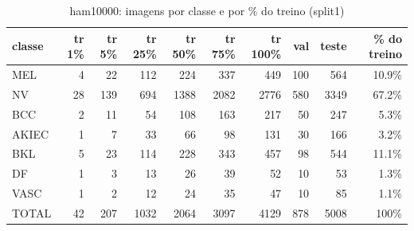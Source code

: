 \begin{table}[h]\centering\small
\caption{ham10000: imagens por classe e por \% do treino (split1)}
\begin{tabular}{lrrrrrrrrr}\toprule
classe & tr 1\% & tr 5\% & tr 25\% & tr 50\% & tr 75\% & tr 100\% & val & teste & \% do treino \\\midrule
MEL & 4 & 22 & 112 & 224 & 337 & 449 & 100 & 564 & 10.9\% \\
NV & 28 & 139 & 694 & 1388 & 2082 & 2776 & 580 & 3349 & 67.2\% \\
BCC & 2 & 11 & 54 & 108 & 163 & 217 & 50 & 247 & 5.3\% \\
AKIEC & 1 & 7 & 33 & 66 & 98 & 131 & 30 & 166 & 3.2\% \\
BKL & 5 & 23 & 114 & 228 & 343 & 457 & 98 & 544 & 11.1\% \\
DF & 1 & 3 & 13 & 26 & 39 & 52 & 10 & 53 & 1.3\% \\
VASC & 1 & 2 & 12 & 24 & 35 & 47 & 10 & 85 & 1.1\% \\
\midrule TOTAL & 42 & 207 & 1032 & 2064 & 3097 & 4129 & 878 & 5008 & 100\% \\\bottomrule
\end{tabular}\end{table}
